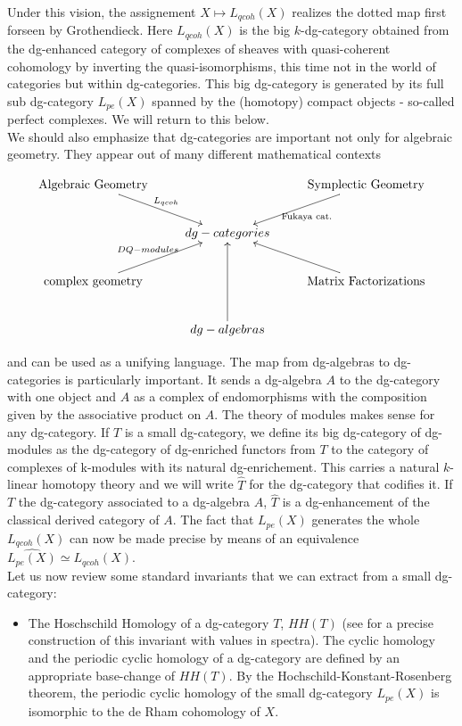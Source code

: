 \begin{refsection}
Under this vision, the assignement $X\mapsto L_{qcoh}(X)$ realizes the dotted map first forseen by Grothendieck. Here $L_{qcoh}(X)$ is the big $k$-dg-category obtained from the dg-enhanced category of complexes of sheaves with quasi-coherent cohomology by inverting the quasi-isomorphisms, this time not in the world of categories but within dg-categories. This big dg-category is generated by its full sub dg-category $L_{pe}(X)$ spanned by the (homotopy) compact objects - so-called perfect complexes. We will return to this below. \\

We should also emphasize that dg-categories are important not only for algebraic geometry. They appear out of many different mathematical contexts

$$
\xymatrix{
\text{Algebraic Geometry}\ar[dr]^{L_{qcoh}}&&\text{Symplectic Geometry}\ar[dl]^(0.5){\text{Fukaya cat.}}\\
&dg-categories&\\
\text{complex geometry}\ar[ur]^(0.5){DQ-modules}&& \text{Matrix Factorizations}\ar[ul]\\
&dg-algebras\ar[uu]&\\
}
$$

\noindent and can be used as a unifying language. The map from dg-algebras to dg-categories is particularly important. It sends a dg-algebra $A$ to the dg-category with one object and $A$ as a complex of endomorphisms with the composition given by the associative product on $A$. The theory of modules makes sense for any dg-category. If $T$ is a small dg-category, we define its big dg-category of dg-modules as the dg-category of  dg-enriched functors from $T$ to the category of complexes of k-modules with its natural dg-enrichement. This carries a natural $k$-linear homotopy theory and we will write $\widehat{T}$ for the dg-category that codifies it.  If $T$ the dg-category associated to a dg-algebra $A$, $\widehat{T}$ is a dg-enhancement of the classical derived category of $A$. The fact that $L_{pe}(X)$ generates the whole $L_{qcoh}(X)$ can now be made precise by means of an equivalence  $\widehat{L_{pe}(X)}\simeq  L_{qcoh}(X)$. \\


Let us now review some standard invariants that we can extract from a small dg-category:

\begin{itemize}
\item The Hoschschild Homology of a dg-category $T$, $HH(T)$ (see \cite{Anthony-thesis} for a precise construction of this invariant with values in spectra). The cyclic homology and the periodic cyclic homology of a dg-category are defined by an appropriate base-change of $HH(T)$. By the Hochschild-Konstant-Rosenberg theorem, the periodic cyclic homology of the small dg-category  $L_{pe}(X)$ is isomorphic to the de Rham cohomology of $X$.


\end{itemize}
\end{refsection}
